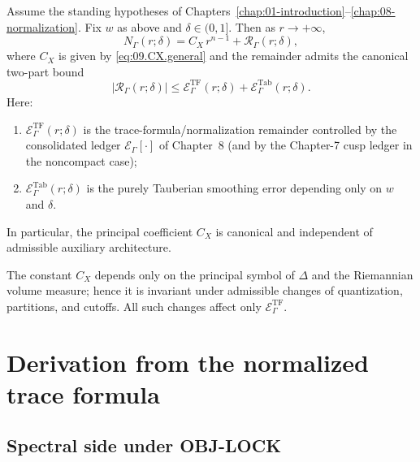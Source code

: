 \begin{theorem}\label{thm:09.smoothed-weyl}
Assume the standing hypotheses of Chapters~\ref{chap:01-introduction}--\ref{chap:08-normalization}.
Fix $w$ as above and $\delta\in(0,1]$.
Then as $r\to+\infty$,
\begin{equation}\label{eq:09.smoothed.weyl}
N_\Gamma(r;\delta)=C_X\,r^{n-1}+\mathcal R_\Gamma(r;\delta),
\end{equation}
where $C_X$ is given by \eqref{eq:09.CX.general} and the remainder admits the canonical two-part bound
\begin{equation}\label{eq:09.remainder.bound}
|\mathcal R_\Gamma(r;\delta)|
\le
\mathcal E^{\mathrm{TF}}_\Gamma(r;\delta)
+
\mathcal E^{\mathrm{Tab}}_\Gamma(r;\delta).
\end{equation}
Here:
\begin{enumerate}
\item $\mathcal E^{\mathrm{TF}}_\Gamma(r;\delta)$ is the trace-formula/normalization remainder controlled by the consolidated ledger
$\mathcal E_\Gamma[\cdot]$ of Chapter~8 (and by the Chapter-7 cusp ledger in the noncompact case);
\item $\mathcal E^{\mathrm{Tab}}_\Gamma(r;\delta)$ is the purely Tauberian smoothing error depending only on $w$ and $\delta$.
\end{enumerate}
In particular, the principal coefficient $C_X$ is canonical and independent of admissible auxiliary architecture.
\end{theorem}

\begin{remark}\label{rem:09.principal-term}
The constant $C_X$ depends only on the principal symbol of $\Delta$ and the Riemannian volume measure; hence it is invariant under
admissible changes of quantization, partitions, and cutoffs. All such changes affect only $\mathcal E^{\mathrm{TF}}_\Gamma$.
\end{remark}

\section{Derivation from the normalized trace formula}
\label{sec:09.derivation}

\subsection{Spectral side under OBJ-LOCK}\label{subsec:09.spectral-side}

